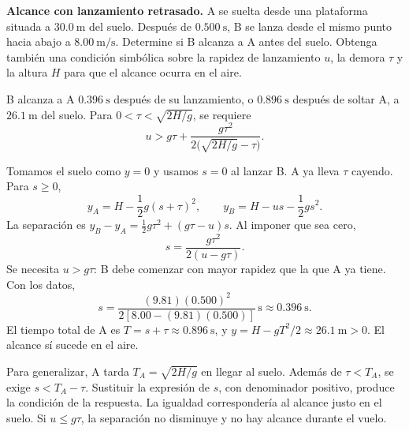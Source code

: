 \begin{ejercicio}
\textbf{Alcance con lanzamiento retrasado.} A se suelta desde una plataforma situada a \(\SI{30.0}{\meter}\) del suelo. Después de \(\SI{0.500}{\second}\), B se lanza desde el mismo punto hacia abajo a \(\SI{8.00}{\meter\per\second}\). Determine si B alcanza a A antes del suelo. Obtenga también una condición simbólica sobre la rapidez de lanzamiento \(u\), la demora \(\tau\) y la altura \(H\) para que el alcance ocurra en el aire.
\end{ejercicio}
\begin{respuesta}
B alcanza a A \(\SI{0.396}{\second}\) después de su lanzamiento, o \(\SI{0.896}{\second}\) después de soltar A, a \(\SI{26.1}{\meter}\) del suelo. Para \(0<\tau<\sqrt{2H/g}\), se requiere
\[ u>g\tau+\frac{g\tau^2}{2\bigl(\sqrt{2H/g}-\tau\bigr)}. \]
\end{respuesta}
\begin{explicacion}
Tomamos el suelo como \(y=0\) y usamos \(s=0\) al lanzar B. A ya lleva \(\tau\) cayendo. Para \(s\geq0\),
\[ y_A=H-\frac12g(s+\tau)^2,\qquad y_B=H-us-\frac12gs^2. \]
La separación es \(y_B-y_A=\frac12g\tau^2+(g\tau-u)s\). Al imponer que sea cero,
\[ s=\frac{g\tau^2}{2(u-g\tau)}. \]
Se necesita \(u>g\tau\): B debe comenzar con mayor rapidez que la que A ya tiene. Con los datos,
\[ s=\frac{(9.81)(0.500)^2}{2[8.00-(9.81)(0.500)]}\,\si{\second}\approx\SI{0.396}{\second}. \]
El tiempo total de A es \(T=s+\tau\approx\SI{0.896}{\second}\), y \(y=H-gT^2/2\approx\SI{26.1}{\meter}>0\). El alcance sí sucede en el aire.

Para generalizar, A tarda \(T_A=\sqrt{2H/g}\) en llegar al suelo. Además de \(\tau<T_A\), se exige \(s<T_A-\tau\). Sustituir la expresión de \(s\), con denominador positivo, produce la condición de la respuesta. La igualdad correspondería al alcance justo en el suelo. Si \(u\leq g\tau\), la separación no disminuye y no hay alcance durante el vuelo.
\end{explicacion}

